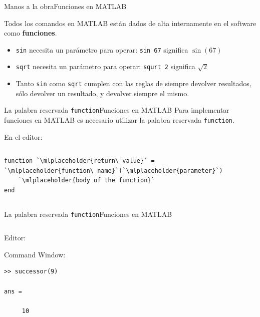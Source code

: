 \documentclass[spanish, c, handout]{beamer}
\newcommand{\matlab}[1]{\lstinline[style=Matlab-editor]!#1!}
\begin{document}
\begin{frame}{Manos a la obra}{Funciones en MATLAB}

    Todos los comandos en MATLAB están dados de alta internamente en el software como \textbf{funciones}. \pause

    \bigskip

    \begin{itemize}[<+->]
        \itemsep2ex
        \item \matlab{sin} necesita un parámetro para operar: \matlab{sin 67} significa $\sin(67)$
        \item \matlab{sqrt} necesita un parámetro para operar: \matlab{squrt 2} significa $\sqrt{2}$
        \item Tanto \matlab{sin} como \matlab{sqrt} cumplen con las reglas de siempre devolver resultados, sólo devolver un resultado, y devolver siempre el mismo.
    \end{itemize}

\end{frame}

\begin{frame}[fragile]{La palabra reservada \matlab{function}}{Funciones en MATLAB}
    Para implementar funciones en MATLAB es necesario utilizar la palabra reservada \matlab{function}.
    
    \bigskip

    En el editor:

    \bigskip

    \begin{columns}
        \begin{column}{0.95\textwidth}
            \begin{lstlisting}
function `\mlplaceholder{return\_value}` = `\mlplaceholder{function\_name}`(`\mlplaceholder{parameter}`)
    `\mlplaceholder{body of the function}`
end
            \end{lstlisting}
        \end{column}
    \end{columns}

\end{frame}

\begin{frame}[fragile]{La palabra reservada \matlab{function}}{Funciones en MATLAB}
    \begin{columns}
        \begin{column}{0.95\linewidth}
            Editor:
            \bigskip
            

            \bigskip
            
            Command Window:
            \bigskip
\begin{lstlisting}[style=output]
>> successor(9)

ans =

     10
\end{lstlisting}
        \end{column}
    \end{columns}
\end{frame}
\end{document}
